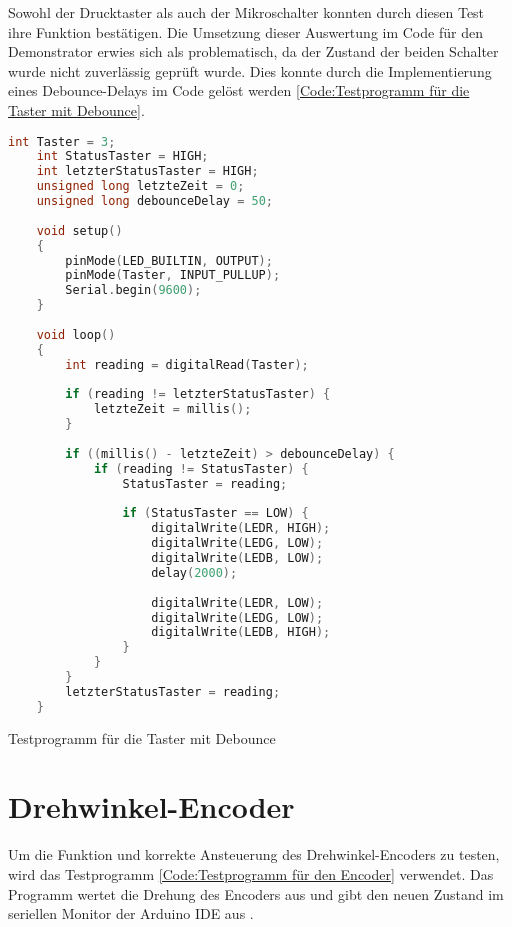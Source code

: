 Sowohl der Drucktaster als auch der Mikroschalter konnten durch diesen Test ihre Funktion bestätigen. Die Umsetzung dieser Auswertung im Code für den Demonstrator erwies sich als problematisch, da der Zustand der beiden Schalter wurde nicht zuverlässig geprüft wurde. Dies konnte durch die Implementierung eines Debounce-Delays \cite{SM.2022} im Code gelöst werden \ref{Code:Testprogramm für die Taster mit Debounce}.

\begin{code}[H]
	\begin{lstlisting}[language=c++]
	int Taster = 3;
	int StatusTaster = HIGH;
	int letzterStatusTaster = HIGH;
	unsigned long letzteZeit = 0;
	unsigned long debounceDelay = 50;
	
	void setup()
	{
		pinMode(LED_BUILTIN, OUTPUT);
		pinMode(Taster, INPUT_PULLUP);
		Serial.begin(9600);
	}
	
	void loop()
	{
		int reading = digitalRead(Taster);
		
		if (reading != letzterStatusTaster) {
			letzteZeit = millis();
		}
		
		if ((millis() - letzteZeit) > debounceDelay) {
			if (reading != StatusTaster) {
				StatusTaster = reading;
				
				if (StatusTaster == LOW) {
					digitalWrite(LEDR, HIGH);
					digitalWrite(LEDG, LOW);
					digitalWrite(LEDB, LOW);
					delay(2000);
					
					digitalWrite(LEDR, LOW);
					digitalWrite(LEDG, LOW);
					digitalWrite(LEDB, HIGH);
				}
			}
		}
		letzterStatusTaster = reading;
	}
\end{lstlisting}      

\caption[Testprogramm für die Taster mit Debounce]{Testprogramm für die Taster mit Debounce}\label{Code:Testprogramm für die Taster mit Debounce}    
\end{code}


\section{Drehwinkel-Encoder}

Um die Funktion und korrekte Ansteuerung des Drehwinkel-Encoders zu testen, wird das Testprogramm \ref{Code:Testprogramm für den Encoder} verwendet. Das Programm wertet die Drehung des Encoders aus und gibt den neuen Zustand im seriellen Monitor der Arduino IDE aus \cite{Funduino.2024}.

